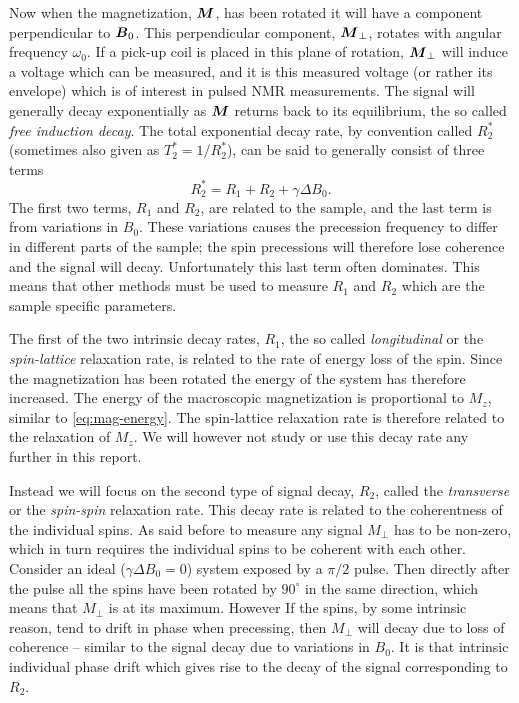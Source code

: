 \documentclass[11pt,a4paper, twocolumn,
swedish, english %
]{article}
\begin{document}
Now when the magnetization, $\vb*M$, has been rotated it will have a
component perpendicular to $\vb*B_0$. This perpendicular component,
$\vb*M_\perp$, rotates with angular frequency $\omega_0$. If a pick-up
coil is placed in this plane of rotation, $\vb*M_\perp$ will induce a
voltage which can be measured, and it is this measured voltage (or
rather its envelope) which is of interest in pulsed NMR
measurements. The signal will generally decay exponentially as
$\vb*M$ returns back to its equilibrium, the so called 
\emph{free induction decay}. The total exponential decay rate, by
convention called $R_2^*$ (sometimes also given as $T_2^*=1/R_2^*$),
can be said to generally consist of three terms 
\begin{equation}
R_2^*= R_1 + R_2 + \gamma\Delta B_0.
\end{equation}
The first two terms, $R_1$ and $R_2$, are related to the sample, and
the last term is from variations in $B_0$. These variations causes the
precession frequency to differ in different parts of the sample; the
spin precessions will therefore lose coherence and the signal will
decay. Unfortunately this last term often dominates. This means that
other methods must be used to measure $R_1$ and $R_2$ which are the
sample specific parameters. 

The first of the two intrinsic decay rates, $R_1$, the so called
\emph{longitudinal} or the \emph{spin-lattice} relaxation rate, is
related to the rate of energy loss of the spin. Since the
magnetization has been rotated the energy of the system has therefore
increased. The energy of the macroscopic magnetization is proportional
to $M_z$, similar to \eqref{eq:mag-energy}. The spin-lattice
relaxation rate is therefore related to the relaxation of $M_z$. We
will however not study or use this decay rate any further in this
report. 

Instead we will focus on the second type of signal decay, $R_2$,
called the \emph{transverse} or the \emph{spin-spin} relaxation
rate. This decay rate is related to the coherentness of the individual
spins. As said before to measure any signal $M_\perp$ has to be
non-zero, which in turn requires the individual spins to be coherent
with each other. Consider an ideal ($\gamma\Delta B_0=0$) system
exposed by a $\pi/2$ pulse. Then directly after the pulse all the
spins have been rotated by $90^\circ$ in the same direction, which
means that $M_\perp$ is at its maximum. However If the spins, by some
intrinsic reason, tend to drift in phase when precessing, then
$M_\perp$ will decay due to loss of coherence -- similar to the signal
decay due to variations in $B_0$. It is that intrinsic individual
phase drift which gives rise to the decay of the signal corresponding
to $R_2$.  
\end{document}
